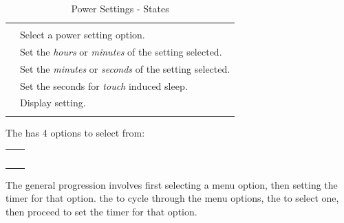 \begin{table}[H]
\centering
\begin{tabu} { X[1,c,m] | X[3,l,m] }
  \thrule
   &  \\ \mrule

   & Select a power setting option. \\ 
   & Set the \textit{hours} or \textit{minutes}
    of the setting selected. \\ 
   & Set the \textit{minutes} or \textit{seconds}
    of the setting selected. \\ 
   & Set the seconds for \textit{touch} induced sleep. \\ 
   & Display setting. \\
  \bhrule
\end{tabu}
\caption{Power Settings - States}
\end{table}

The  has \num{4} options to select from:

\begin{table}[H]
\centering
\begin{tabu}{c c}
   &  \\ \mrule
   &  \\
   &  \\
   &  \\
   &  \\
\end{tabu}
\end{table}

The general progression involves first selecting a menu option, then
setting the timer for that option.   the  to cycle through the
menu options,  the  to select one, then proceed to set the timer
for that option.


